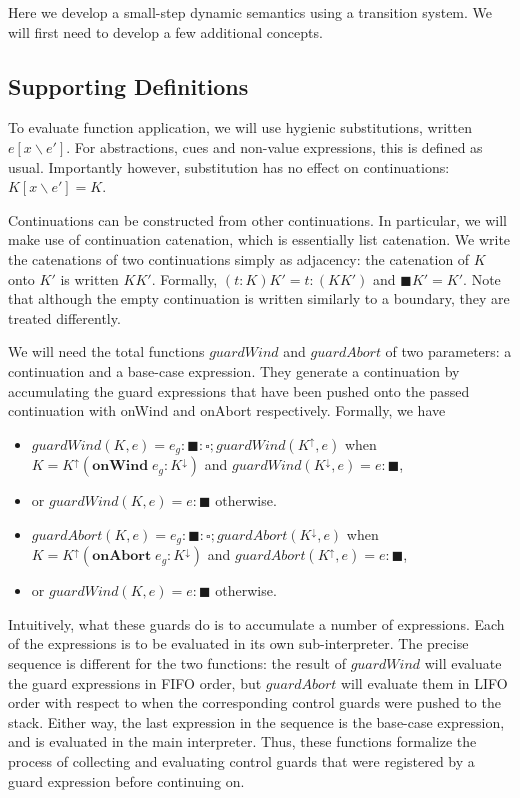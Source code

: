 \documentclass[11pt]{article}
\begin{document}
Here we develop a small-step dynamic semantics using a transition system.
We will first need to develop a few additional concepts.

\subsection{Supporting Definitions}

To evaluate function application, we will use hygienic substitutions, written $e[x\backslash e']$.
For abstractions, cues and non-value expressions, this is defined as usual.
Importantly however, substitution has no effect on continuations: $K[x\backslash e'] = K$.

Continuations can be constructed from other continuations.
In particular, we will make use of continuation catenation, which is essentially list catenation.
We write the catenations of two continuations simply as adjacency: the catenation of $K$ onto $K'$ is written $KK'$.
Formally, $(t:K)K' = t:(KK')$ and $\blacksquare K' = K'$.
Note that although the empty continuation is written similarly to a boundary, they are treated differently.

We will need the total functions $guardWind$ and $guardAbort$ of two parameters: a continuation and a base-case expression.
They generate a continuation by accumulating the guard expressions that have been pushed onto the passed continuation with \textsf{onWind} and \textsf{onAbort} respectively.
Formally, we have
\begin{itemize}
\item $guardWind(K, e) = e_g : \blacksquare : \square; guardWind(K^\uparrow, e)$ when $K = K^\uparrow(\textbf{onWind}\;e_g:K^\downarrow)$ and $guardWind(K^\downarrow, e) = e:\blacksquare$,
\item or $guardWind(K, e) = e:\blacksquare$ otherwise.
\item $guardAbort(K, e) = e_g : \blacksquare : \square; guardAbort(K^\downarrow, e)$ when $K = {K^\uparrow(\textbf{onAbort}\;e_g:K^\downarrow)}$ and $guardAbort(K^\uparrow, e) = e:\blacksquare$,
\item or $guardWind(K, e) = e:\blacksquare$ otherwise.
\end{itemize}

Intuitively, what these guards do is to accumulate a number of expressions.
Each of the expressions is to be evaluated in its own sub-interpreter.
The precise sequence is different for the two functions: the result of $guardWind$ will evaluate the guard expressions in FIFO order, but $guardAbort$ will evaluate them in LIFO order with respect to when the corresponding control guards were pushed to the stack.
Either way, the last expression in the sequence is the base-case expression, and is evaluated in the main interpreter.
Thus, these functions formalize the process of collecting and evaluating control guards that were registered by a guard expression before continuing on.
\end{document}
